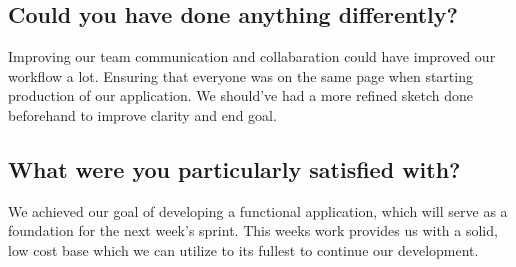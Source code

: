 \documentclass[12pt]{article}
\begin{document}
\subsection{Could you have done anything differently?}
Improving our team communication and collabaration could have improved our workflow a lot. Ensuring that everyone was on the 
same page when starting production of our application. We should've had a more refined sketch done beforehand to improve 
clarity and end goal.

\subsection{What were you particularly satisfied with?}
We achieved our goal of developing a functional application, which will serve as a foundation for the next week's sprint. 
This weeks work provides us with a solid, low cost base which we can utilize to its fullest to continue our development.
\end{document}
